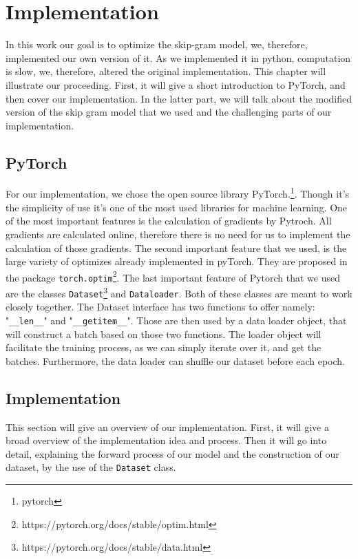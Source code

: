 \chapter{Implementation}\label{chap:implementation}

In this work our goal is to optimize the skip-gram model, we, therefore, implemented our own version of it. As we implemented it in python, computation is slow, we, therefore, altered the original implementation. 
This chapter will illustrate our proceeding. First, it will give a short introduction to PyTorch, and then cover our implementation. In the latter part, we will talk about the modified version of the skip gram model that we used and the challenging parts of our implementation.
\section{PyTorch}
For our implementation, we chose the open source library PyTorch.\footnote{pytorch}. Though it's the simplicity of use it's one of the most used libraries for machine learning. One of the most important features is the calculation of gradients by Pytroch. All gradients are calculated online, therefore there is no need for us to implement the calculation of those gradients. The second important feature that we used, is the large variety of optimizes already implemented in pyTorch. They are proposed in the package \texttt{torch.optim}\footnote{https://pytorch.org/docs/stable/optim.html}. The last important feature of Pytorch that we used are the classes \texttt{Dataset}\footnote{\label{note_data}https://pytorch.org/docs/stable/data.html} and \texttt{Dataloader}\footnotemark[\ref{note_data}]. Both of these classes are meant to work closely together.   The Dataset interface has two functions to offer namely: "\texttt{\_\_len\_\_}" and "\texttt{\_\_getitem\_\_}". Those are then used by a data loader object, that will construct a batch based on those two functions. The loader object will facilitate the training process, as we can simply iterate over it, and get the batches. Furthermore, the data loader can shuffle our dataset before each epoch. 
\section{Implementation}
This section will give an overview of our implementation. First, it will give a broad overview of the implementation idea and process. Then it will go into detail, explaining the forward process of our model and the construction of our dataset, by the use of the \texttt{Dataset} class. 
